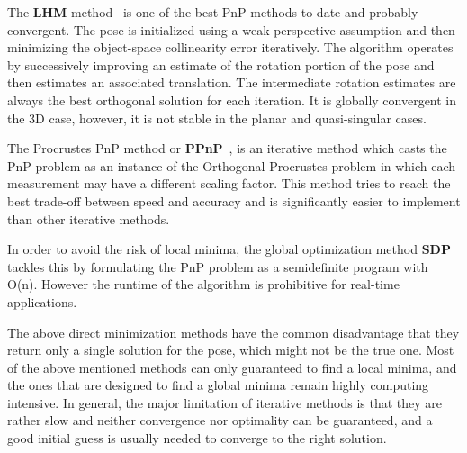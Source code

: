 \documentclass[letterpaper, 10 pt, conference]{ieeeconf}  %
\begin{document}
The \textbf{LHM} method~\cite{Lu2000} is one of the best PnP methods to date and probably convergent. The pose is initialized using a weak perspective assumption and then minimizing the object-space collinearity error iteratively. The algorithm operates by successively improving an estimate of the rotation portion of the pose and then estimates an associated translation. The intermediate rotation estimates are always the best orthogonal solution for each iteration. It is globally convergent in the 3D case, however, it is not stable in the planar and quasi-singular cases. %


The Procrustes PnP method or \textbf{PPnP}~\cite{Garro2012}, is an iterative method which casts the PnP problem as an instance of the Orthogonal Procrustes problem in which each measurement may have a different scaling factor. This method tries to reach the best trade-off between speed and accuracy and is significantly easier to implement than other iterative methods.   %


In order to avoid the risk of local minima, the global optimization method \textbf{SDP}~\cite{Schweighofer2008} tackles this by formulating the PnP problem as a semidefinite program with O(n). However the runtime of the algorithm is prohibitive for real-time applications. %

The above direct minimization methods \cite{Oberkampf1996,Lu2000,Garro2012,Schweighofer2008} have the common disadvantage that they return only a single solution for the pose, which might not be the true one. Most of the above mentioned methods can only guaranteed to find a local minima, and the ones that are designed to find a global minima remain highly computing intensive. In general, the major limitation of iterative methods is that they are rather slow and neither convergence nor optimality can be guaranteed, and a good initial guess is usually needed to converge to the right solution.
\end{document}
